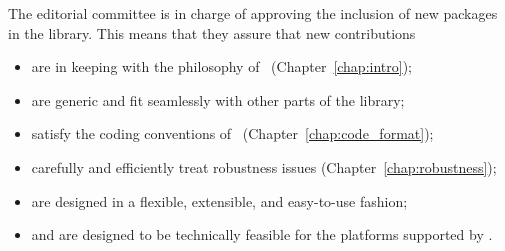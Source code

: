 



The editorial committee is in charge of approving the inclusion of new packages
in the library.  This means that they assure that new contributions
\begin{itemize}
   \item are in keeping with the philosophy of \cgal\ (Chapter~\ref{chap:intro});
   \item are generic and fit seamlessly with other parts of
         the library;
   \item satisfy the coding conventions of \cgal\ (Chapter~\ref{chap:code_format});
   \item carefully and efficiently treat robustness issues
         (Chapter~\ref{chap:robustness});
   \item are designed in a flexible, extensible, and easy-to-use fashion;
   \item and are designed to be technically feasible for the platforms
         supported by \cgal.
\end{itemize}

